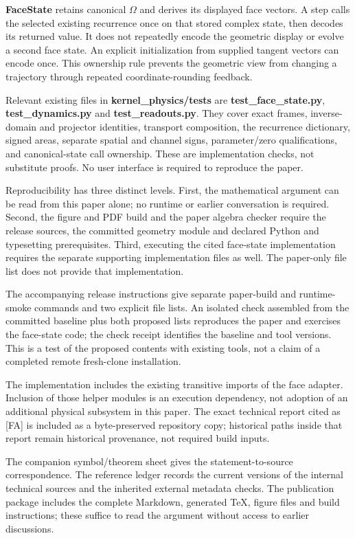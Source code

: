 \documentclass[
  11pt,
  a4paper,
]{article}
\begin{document}
\textbf{FaceState} retains canonical \(\Omega\) and derives its displayed face vectors. A step calls the selected existing recurrence once on that stored complex state, then decodes its returned value. It does not repeatedly encode the geometric display or evolve a second face state. An explicit initialization from supplied tangent vectors can encode once. This ownership rule prevents the geometric view from changing a trajectory through repeated coordinate-rounding feedback.

Relevant existing files in \textbf{kernel\_physics/tests} are \textbf{test\_face\_state.py}, \textbf{test\_dynamics.py} and \textbf{test\_readouts.py}. They cover exact frames, inverse-domain and projector identities, transport composition, the recurrence dictionary, signed areas, separate spatial and channel signs, parameter/zero qualifications, and canonical-state call ownership. These are implementation checks, not substitute proofs. No user interface is required to reproduce the paper.

Reproducibility has three distinct levels. First, the mathematical argument can be read from this paper alone; no runtime or earlier conversation is required. Second, the figure and PDF build and the paper algebra checker require the release sources, the committed geometry module and declared Python and typesetting prerequisites. Third, executing the cited face-state implementation requires the separate supporting implementation files as well. The paper-only file list does not provide that implementation.

The accompanying release instructions give separate paper-build and runtime-smoke commands and two explicit file lists. An isolated check assembled from the committed baseline plus both proposed lists reproduces the paper and exercises the face-state code; the check receipt identifies the baseline and tool versions. This is a test of the proposed contents with existing tools, not a claim of a completed remote fresh-clone installation.

The implementation includes the existing transitive imports of the face adapter. Inclusion of those helper modules is an execution dependency, not adoption of an additional physical subsystem in this paper. The exact technical report cited as {[}FA{]} is included as a byte-preserved repository copy; historical paths inside that report remain historical provenance, not required build inputs.

The companion symbol/theorem sheet gives the statement-to-source correspondence. The reference ledger records the current versions of the internal technical sources and the inherited external metadata checks. The publication package includes the complete Markdown, generated TeX, figure files and build instructions; these suffice to read the argument without access to earlier discussions.
\end{document}
